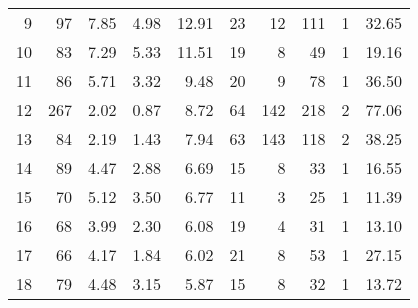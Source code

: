 \begin{tabular}{rrrrrrrrrr}
 9 &       97 &                             7.85 &                             4.98 &                            12.91 &              23 &              12 &                       111 &          1 &                        32.65 \\
10 &       83 &                             7.29 &                             5.33 &                            11.51 &              19 &               8 &                        49 &          1 &                        19.16 \\
11 &       86 &                             5.71 &                             3.32 &                             9.48 &              20 &               9 &                        78 &          1 &                        36.50 \\
12 &      267 &                             2.02 &                             0.87 &                             8.72 &              64 &             142 &                       218 &          2 &                        77.06 \\
13 &       84 &                             2.19 &                             1.43 &                             7.94 &              63 &             143 &                       118 &          2 &                        38.25 \\
14 &       89 &                             4.47 &                             2.88 &                             6.69 &              15 &               8 &                        33 &          1 &                        16.55 \\
15 &       70 &                             5.12 &                             3.50 &                             6.77 &              11 &               3 &                        25 &          1 &                        11.39 \\
16 &       68 &                             3.99 &                             2.30 &                             6.08 &              19 &               4 &                        31 &          1 &                        13.10 \\
17 &       66 &                             4.17 &                             1.84 &                             6.02 &              21 &               8 &                        53 &          1 &                        27.15 \\
18 &       79 &                             4.48 &                             3.15 &                             5.87 &              15 &               8 &                        32 &          1 &                        13.72 \\

\end{tabular}
